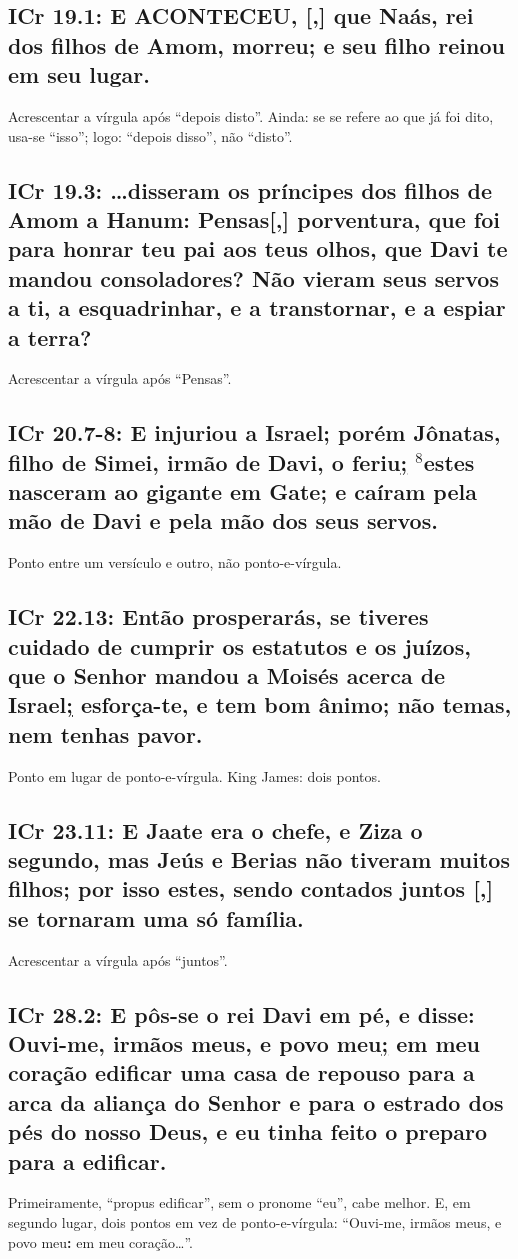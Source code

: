 \subsection{ICr 19.1: E ACONTECEU, [,] que Naás, rei dos filhos de Amom, morreu; e seu filho reinou em seu lugar.}
Acrescentar a vírgula após ``depois disto''. Ainda: se se refere ao
que já foi dito, usa-se ``isso''; logo: ``depois disso'', não ``disto''.

\subsection{ICr 19.3: \ldots disseram os príncipes dos filhos de Amom a Hanum: Pensas[,] porventura, que foi para honrar teu pai aos teus olhos, que Davi te mandou consoladores? Não vieram seus servos a ti, a esquadrinhar, e a transtornar, e a espiar a terra?}
Acrescentar a vírgula após ``Pensas''.

\subsection{ICr 20.7-8: E injuriou a Israel; porém Jônatas, filho de Simei, irmão de Davi, o feriu\uline{;} $^{\mathrm{8}}$estes nasceram ao gigante em Gate; e caíram pela mão de Davi e pela mão dos seus servos.}
Ponto entre um versículo e outro, não ponto-e-vírgula.

\subsection{ICr 22.13: Então prosperarás, se tiveres cuidado de cumprir os estatutos e os juízos, que o Senhor mandou a Moisés acerca de Israel\uline{;} esforça-te, e tem bom ânimo; não temas, nem tenhas pavor.}
Ponto em lugar de ponto-e-vírgula. King James: dois pontos.

\subsection{ICr 23.11: E Jaate era o chefe, e Ziza o segundo, mas Jeús e Berias não tiveram muitos filhos; por isso estes, sendo contados juntos [,] se tornaram uma só família.}
Acrescentar a vírgula após ``juntos''.

\subsection{ICr 28.2: E pôs-se o rei Davi em pé, e disse: Ouvi-me, irmãos meus, e povo meu\uline{;} em meu coração  edificar uma casa de repouso para a arca da aliança do Senhor e para o estrado dos pés do nosso Deus, e eu tinha feito o preparo para a edificar.}
Primeiramente, ``propus edificar'', sem o pronome ``eu'', cabe
melhor.  E, em segundo lugar, dois pontos em vez de ponto-e-vírgula: ``Ouvi-me,
irmãos meus, e povo meu\textbf{:} em meu coração\ldots''.


